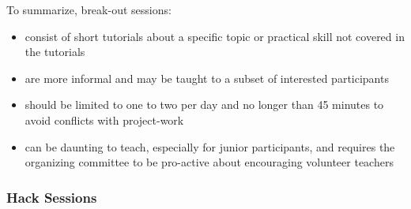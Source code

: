 \documentclass{aastex62}
\begin{document}
To summarize, break-out sessions:
\begin{itemize}
\item consist of short tutorials about a specific topic or practical skill not covered in the tutorials
\item are more informal and may be taught to a subset of interested participants
\item should be limited to one to two per day and no longer than 45 minutes to avoid conflicts with project-work
\item can be daunting to teach, especially for junior participants, and requires the organizing committee to be pro-active about encouraging volunteer teachers
\end{itemize}

\subsubsection{Hack Sessions}
\end{document}

